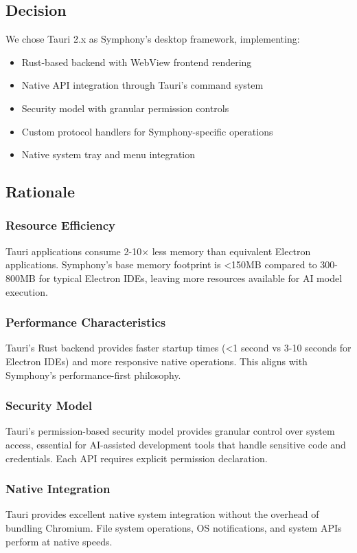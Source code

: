 \subsection*{Decision}

We chose Tauri 2.x as Symphony's desktop framework, implementing:

\begin{itemize}
\item Rust-based backend with WebView frontend rendering
\item Native API integration through Tauri's command system
\item Security model with granular permission controls
\item Custom protocol handlers for Symphony-specific operations
\item Native system tray and menu integration
\end{itemize}

\subsection*{Rationale}

\subsubsection*{Resource Efficiency}
Tauri applications consume 2-10× less memory than equivalent Electron applications. Symphony's base memory footprint is <150MB compared to 300-800MB for typical Electron IDEs, leaving more resources available for AI model execution.

\subsubsection*{Performance Characteristics}
Tauri's Rust backend provides faster startup times (<1 second vs 3-10 seconds for Electron IDEs) and more responsive native operations. This aligns with Symphony's performance-first philosophy.

\subsubsection*{Security Model}
Tauri's permission-based security model provides granular control over system access, essential for AI-assisted development tools that handle sensitive code and credentials. Each API requires explicit permission declaration.

\subsubsection*{Native Integration}
Tauri provides excellent native system integration without the overhead of bundling Chromium. File system operations, OS notifications, and system APIs perform at native speeds.

